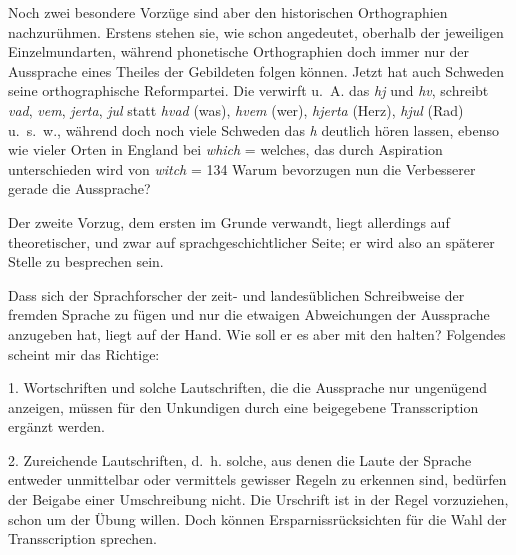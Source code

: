 \largerpage[-1]
Noch zwei besondere Vorzüge sind aber den historischen Orthographien nachzurühmen. Erstens stehen sie, wie schon angedeutet, oberhalb der jeweiligen Einzelmundarten, während phonetische Orthographien doch immer nur der Aussprache eines Theiles der Gebildeten folgen können. Jetzt hat auch Schweden seine orthographische Reformpartei. Die verwirft u.~A. das \textit{hj} und \textit{hv}, schreibt \textit{vad}, \textit{vem}, \textit{jerta}, \textit{jul} statt \textit{hvad} (was), \textit{hvem} (wer), \textit{hjerta} (Herz), \textit{hjul} (Rad) u.~s.~w., während doch noch viele Schweden das \textit{h} deutlich hören lassen, ebenso wie vieler Orten \label{fp.143} in England bei \textit{which} = welches, das durch Aspiration unterschieden wird von \textit{witch} =   {\textbar}{\textbar}134{\textbar}{\textbar}\label{sp.134}  Warum bevorzugen nun die Verbesserer gerade die  Aussprache?

Der zweite Vorzug, dem ersten im Grunde verwandt, liegt allerdings auf theoretischer, und zwar auf sprachgeschichtlicher Seite; er wird also an späterer Stelle zu besprechen sein.

Dass sich der Sprachforscher der zeit- und landesüblichen Schreibweise der fremden Sprache zu fügen und nur die etwaigen Abweichungen der Aussprache anzugeben hat, liegt auf der Hand. Wie soll er es aber mit den  halten? Folgendes scheint mir das Richtige:

1. Wortschriften und solche Lautschriften, die die Aussprache nur ungenügend anzeigen, müssen für den Unkundigen durch eine beigegebene Transscription ergänzt werden.

2. Zureichende Lautschriften, d.~h. solche, aus denen die Laute der Sprache entweder unmittelbar oder vermittels gewisser Regeln zu erkennen sind, bedürfen der Beigabe einer Umschreibung nicht. Die Urschrift ist in der Regel vorzuziehen, schon um der Übung willen. Doch können Ersparnissrücksichten für die Wahl der Transscription sprechen. 

